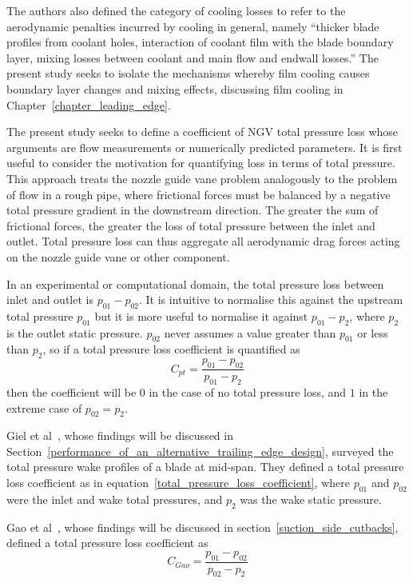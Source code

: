 \documentclass[a4paper, 11pt, oneside]{report}
\begin{document}
The authors also defined the category of cooling losses to refer to the aerodynamic penalties incurred by cooling in general, namely ``thicker blade profiles from coolant holes, interaction of coolant film with the blade boundary layer, mixing losses between coolant and main flow and endwall losses.'' The present study seeks to isolate the mechanisms whereby film cooling causes boundary layer changes and mixing effects, discussing film cooling in Chapter~\ref{chapter_leading_edge}.

The present study seeks to define a coefficient of NGV total pressure loss whose arguments are flow measurements or numerically predicted parameters. It is first useful to consider the motivation for quantifying loss in terms of total pressure. This approach treats the nozzle guide vane problem analogously to the problem of flow in a rough pipe, where frictional forces must be balanced by a negative total pressure gradient in the downstream direction. The greater the sum of frictional forces, the greater the loss of total pressure between the inlet and outlet. Total pressure loss can thus aggregate all aerodynamic drag forces acting on the nozzle guide vane or other component.

In an experimental or computational domain, the total pressure loss between inlet and outlet is $p_{01} - p_{02}$. It is intuitive to normalise this against the upstream total pressure $p_{01}$ but it is more useful to normalise it against $p_{01} - p_2$, where $p_2$ is the outlet static pressure. $p_{02}$ never assumes a value greater than $p_{01}$ or less than $p_2$, so if a total pressure loss coefficient is quantified as
\begin{equation}\label{total_pressure_loss_coefficient}
C_{pt} = \frac{
p_{01} - p_{02}
}{
p_{01} - p_2
}
\end{equation}
then the coefficient will be $0$ in the case of no total pressure loss, and $1$ in the extreme case of $p_{02} = p_2$.

Giel et al~\cite{giel_te_thickness}, whose findings will be discussed in Section~\ref{performance_of_an_alternative_trailing_edge_design}, surveyed the total pressure wake profiles of a blade at mid-span. They defined a total pressure loss coefficient as in equation~\ref{total_pressure_loss_coefficient}, where $p_{01}$ and $p_{02}$ were the inlet and wake total pressures, and $p_2$ was the wake static pressure. 

Gao et al~\cite{gao_te}, whose findings will be discussed in section~\ref{suction_side_cutbacks}, defined a total pressure loss coefficient as
\begin{equation}
C_{Gao} = \frac{
p_{01} - p_{02}
}{
p_{02} - p_2
}
\end{equation}
\end{document}
